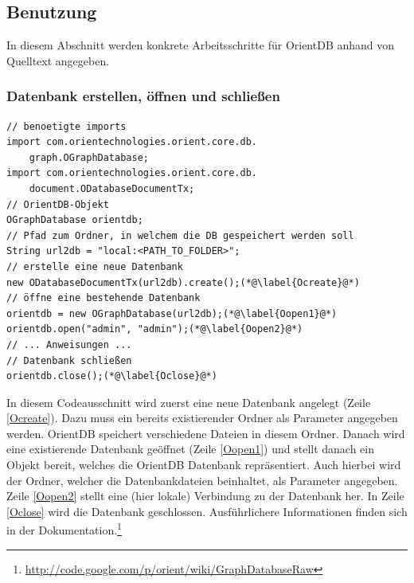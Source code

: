 \documentclass[11pt, a4paper, oneside]{article} %
\begin{document}
\subsection{Benutzung}
In diesem Abschnitt werden konkrete Arbeitsschritte für OrientDB anhand von Quelltext angegeben.

\subsubsection{Datenbank erstellen, öffnen und schließen}
\begin{lstlisting}[caption={OrientDB - Datenbank erstellen, öffnen und schließen}]
// benoetigte imports
import com.orientechnologies.orient.core.db.
	graph.OGraphDatabase;
import com.orientechnologies.orient.core.db.
	document.ODatabaseDocumentTx;
// OrientDB-Objekt
OGraphDatabase orientdb;
// Pfad zum Ordner, in welchem die DB gespeichert werden soll
String url2db = "local:<PATH_TO_FOLDER>";
// erstelle eine neue Datenbank
new ODatabaseDocumentTx(url2db).create();(*@\label{Ocreate}@*)
// öffne eine bestehende Datenbank
orientdb = new OGraphDatabase(url2db);(*@\label{Oopen1}@*)
orientdb.open("admin", "admin");(*@\label{Oopen2}@*)
// ... Anweisungen ...
// Datenbank schließen
orientdb.close();(*@\label{Oclose}@*)
\end{lstlisting}
In diesem Codeausschnitt wird zuerst eine neue Datenbank angelegt (Zeile \ref{Ocreate}). Dazu muss ein bereits existierender Ordner als Parameter angegeben werden. OrientDB speichert verschiedene Dateien in diesem Ordner. Danach wird eine existierende Datenbank geöffnet (Zeile \ref{Oopen1}) und stellt danach ein Objekt bereit, welches die OrientDB Datenbank repräsentiert. Auch hierbei wird der Ordner, welcher die Datenbankdateien beinhaltet, als Parameter angegeben. Zeile \ref{Oopen2} stellt eine (hier lokale) Verbindung zu der Datenbank her. In Zeile \ref{Oclose} wird die Datenbank geschlossen.
Ausführlichere Informationen finden sich in der Dokumentation.\footnote{\url{http://code.google.com/p/orient/wiki/GraphDatabaseRaw}}
\end{document}
